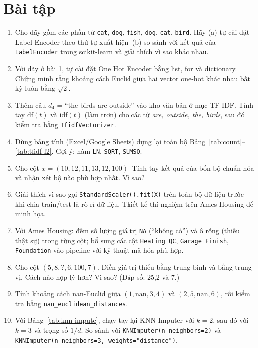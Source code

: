 \section{Bài tập}
\begin{enumerate}
    \item Cho dãy gồm các phần tử \texttt{cat}, \texttt{dog}, \texttt{fish}, \texttt{dog}, \texttt{cat}, \texttt{bird}. Hãy (a) tự cài đặt Label Encoder theo thứ tự xuất hiện; (b) so sánh với kết quả của \texttt{LabelEncoder} trong scikit-learn và giải thích vì sao khác nhau.
    \item Với dãy ở bài 1, tự cài đặt One Hot Encoder bằng list, for và dictionary. Chứng minh rằng khoảng cách Euclid giữa hai vector one-hot khác nhau bất kỳ luôn bằng $\sqrt{2}$.
    \item Thêm câu $d_4$ = ``the birds are outside'' vào kho văn bản ở mục TF-IDF. Tính tay $\mathrm{df}(t)$ và $\mathrm{idf}(t)$ (làm trơn) cho các từ \textit{are, outside, the, birds}, sau đó kiểm tra bằng \texttt{TfidfVectorizer}.
    \item Dùng bảng tính (Excel/Google Sheets) dựng lại toàn bộ Bảng~\ref{tab:count}--\ref{tab:tfidf-l2}. Gợi ý: hàm \texttt{LN}, \texttt{SQRT}, \texttt{SUMSQ}.
    \item Cho cột $x = (10, 12, 11, 13, 12, 100)$. Tính tay kết quả của bốn bộ chuẩn hóa và nhận xét bộ nào phù hợp nhất. Vì sao?
    \item Giải thích vì sao gọi \texttt{StandardScaler().fit(X)} trên toàn bộ dữ liệu trước khi chia train/test là rò rỉ dữ liệu. Thiết kế thí nghiệm trên Ames Housing để minh họa.
    \item Với Ames Housing: đếm số lượng giá trị \texttt{NA} (``không có'') và ô rỗng (thiếu thật sự) trong từng cột; bổ sung các cột \texttt{Heating QC}, \texttt{Garage Finish}, \texttt{Foundation} vào pipeline với kỹ thuật mã hóa phù hợp.
    \item Cho cột $(5, 8, ?, 6, 100, 7)$. Điền giá trị thiếu bằng trung bình và bằng trung vị. Cách nào hợp lý hơn? Vì sao? (Đáp số: 25,2 và 7.)
    \item Tính khoảng cách nan-Euclid giữa $(1, \text{nan}, 3, 4)$ và $(2, 5, \text{nan}, 6)$, rồi kiểm tra bằng \texttt{nan\_euclidean\_distances}.
    \item Với Bảng~\ref{tab:knn-impute}, chạy tay lại KNN Imputer với $k = 2$, sau đó với $k = 3$ và trọng số $1/d$. So sánh với \texttt{KNNImputer(n\_neighbors=2)} và \texttt{KNNImputer(n\_neighbors=3, weights="distance")}.

\end{enumerate}

